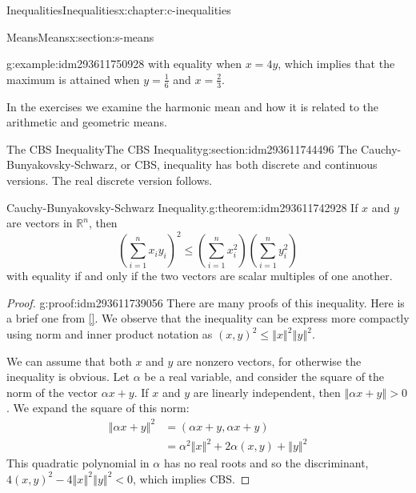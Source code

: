 \documentclass[twoside,10pt,]{book}
\newcommand{\xreffont}{\relax}
\numberwithin{equation}{section}
\newcommand{\lt}{<}
\newcommand{\gt}{>}
\begin{document}
\begin{chapterptx}{Inequalities}{}{Inequalities}{}{}{x:chapter:c-inequalities}
\begin{sectionptx}{Means}{}{Means}{}{}{x:section:s-means}
\begin{example}{}{g:example:idm293611750928}
with equality when \(x=4y\), which implies that the maximum is attained when \(y=\frac{1}{6}\) and \(x=\frac{2}{3}\).%
\end{example}
In the exercises we examine the harmonic mean and how it is related to the arithmetic and geometric means.%
\end{sectionptx}
%
%
\typeout{************************************************}
\typeout{************************************************}
%
\begin{sectionptx}{The CBS Inequality}{}{The CBS Inequality}{}{}{g:section:idm293611744496}
The Cauchy-Bunyakovsky-Schwarz, or CBS, inequality has both discrete and continuous versions.  The real discrete version follows.%
\begin{theorem}{Cauchy-Bunyakovsky-Schwarz Inequality.}{}{g:theorem:idm293611742928}%
%
%
If \(x\) and \(y\) are vectors in \(\mathbb{R}^n\), then%
\begin{equation}
\left(\sum _{i=1}^n x_i y_i\right)^2\leq \left(\sum _{i=1}^n x_i^2\right)\left(
\sum _{i=1}^n y_i^2\right)\label{x:men:eq-cbs}
\end{equation}
with equality if and only if the two vectors are scalar multiples of one another.%
\end{theorem}
\begin{proof}{}{g:proof:idm293611739056}
There are many proofs of this inequality.  Here is a brief one from \hyperlink{x:biblio:biblio-aigner}{[{\xreffont 1}]}. We observe that the inequality can be express more compactly using norm and inner product notation as \((x, y)^2 \leq \left\Vert x \right\Vert^2 \left\Vert y \right\Vert^2 \).%
\par
We can assume that both \(x\) and \(y\) are nonzero vectors, for otherwise the inequality is obvious.  Let \(\alpha\) be a real variable, and consider the square of the norm of the vector \(\alpha x + y\).  If \(x\) and \(y\) are linearly independent, then \(\left\Vert \alpha x + y\right\Vert \gt 0\).  We expand the square of this norm:%
\begin{equation*}
\begin{split}
\left\Vert \alpha x + y \right\Vert^2 &= (\alpha x + y,\alpha x + y)\\
&  = \alpha^2 \left\Vert x \right\Vert^2 + 2 \alpha (x, y) + \left\Vert y \right\Vert^2
\end{split}
\end{equation*}
This quadratic polynomial in \(\alpha\) has no real roots and so the discriminant, \(4 (x, y)^2 - 4\left\Vert x \right\Vert^2 \left\Vert y \right\Vert^2 \lt 0\), which implies CBS.%

\end{proof}
\end{sectionptx}
\end{chapterptx}
\end{document}

